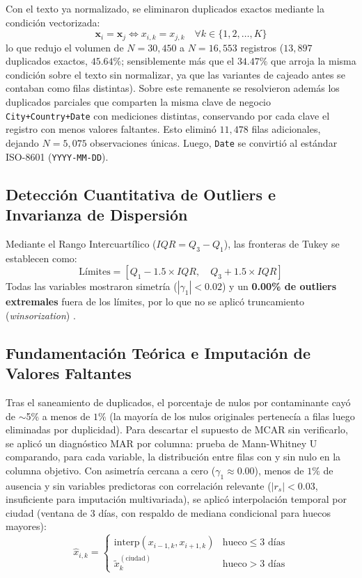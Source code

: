 \documentclass[journal,twocolumn,spanish]{IEEEtran}
\begin{document}
Con el texto ya normalizado, se eliminaron duplicados exactos mediante la condición vectorizada:
\begin{equation}
\mathbf{x}_i = \mathbf{x}_j \iff x_{i,k} = x_{j,k} \quad \forall k \in \{1, 2, \dots, K\}
\end{equation}
lo que redujo el volumen de $N = 30,450$ a $N = 16,553$ registros ($13,897$ duplicados exactos, $45.64\%$; sensiblemente más que el $34.47\%$ que arroja la misma condición sobre el texto sin normalizar, ya que las variantes de cajeado antes se contaban como filas distintas). Sobre este remanente se resolvieron además los duplicados parciales que comparten la misma clave de negocio \texttt{City+Country+Date} con mediciones distintas, conservando por cada clave el registro con menos valores faltantes. Esto eliminó $11,478$ filas adicionales, dejando $N = 5,075$ observaciones únicas. Luego, \texttt{Date} se convirtió al estándar ISO-8601 (\texttt{YYYY-MM-DD}).

\subsection{Detección Cuantitativa de Outliers e Invarianza de Dispersión}
Mediante el Rango Intercuartílico ($IQR = Q_3 - Q_1$), las fronteras de Tukey se establecen como:
\begin{equation}
\text{Límites} = [Q_1 - 1.5 \times IQR, \quad Q_3 + 1.5 \times IQR]
\end{equation}
Todas las variables mostraron simetría ($|\gamma_1| < 0.02$) y un \textbf{0.00\% de outliers extremales} fuera de los límites, por lo que no se aplicó truncamiento (\emph{winsorization}) \cite{Rousseeuw1993}.

\subsection{Fundamentación Teórica e Imputación de Valores Faltantes}
Tras el saneamiento de duplicados, el porcentaje de nulos por contaminante cayó de $\sim$5\% a menos de $1\%$ (la mayoría de los nulos originales pertenecía a filas luego eliminadas por duplicidad). Para descartar el supuesto de MCAR sin verificarlo, se aplicó un diagnóstico MAR por columna: prueba de Mann-Whitney U comparando, para cada variable, la distribución entre filas con y sin nulo en la columna objetivo. Con asimetría cercana a cero ($\gamma_1 \approx 0.00$), menos de $1\%$ de ausencia y sin variables predictoras con correlación relevante ($|r_s| < 0.03$, insuficiente para imputación multivariada), se aplicó interpolación temporal por ciudad (ventana de 3 días, con respaldo de mediana condicional \cite{Little2019} para huecos mayores):
\begin{equation}
\hat{x}_{i,k} = \begin{cases}
\text{interp}(x_{i-1,k}, x_{i+1,k}) & \text{hueco} \le 3 \text{ días} \\
\tilde{x}_{k}^{(\text{ciudad})} & \text{hueco} > 3 \text{ días}
\end{cases}
\end{equation}
\end{document}
